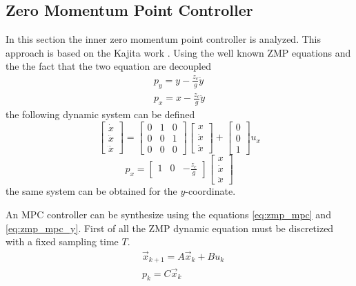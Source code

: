 \subsection{Zero Momentum Point Controller}
In this section the inner zero momentum point controller is analyzed. This approach is based on the
Kajita work \cite{Kajita2003}.
Using the well known ZMP equations and the the fact that the two equation are decoupled
\[
\begin{split}
  p_y = y - \frac{z_c}{g} \ddot{y}\\
  p_x = x - \frac{z_c}{g} \ddot{y}
\end{split}
\]
the following dynamic system can be defined
\begin{equation}
  \label{eq:zmp_mpc}
  \begin{bmatrix}
    \dot{x} \\
    \ddot{x} \\
    \dddot{x}
  \end{bmatrix} =
  \begin{bmatrix}
    0 & 1 & 0 \\
    0 & 0 & 1 \\
    0 & 0 & 0
  \end{bmatrix}
  \begin{bmatrix}
    x \\
    \dot{x} \\
    \ddot{x}
  \end{bmatrix}
  +
  \begin{bmatrix}
    0 \\
    0 \\
    1 
  \end{bmatrix}
  u_x
\end{equation}
\begin{equation}
  \label{eq:zmp_mpc_y}
  p_x =
  \begin{bmatrix}
    1 & 0 & -\frac{z_c}{g}
  \end{bmatrix}
  \begin{bmatrix}
    x \\
    \dot{x} \\
    \ddot{x}
  \end{bmatrix}
\end{equation}
the same system can be obtained for the $y$-coordinate.
\par
An MPC controller can be synthesize using the equations \ref{eq:zmp_mpc} and \ref{eq:zmp_mpc_y}.
First of all the ZMP dynamic equation must be discretized with a fixed sampling time $T$.
\[
\begin{split}
  &\vec{x}_{k + 1} = A \vec{x}_k + B u_k\\
  &p_k = C \vec{x}_{k}
\end{split}
\]
